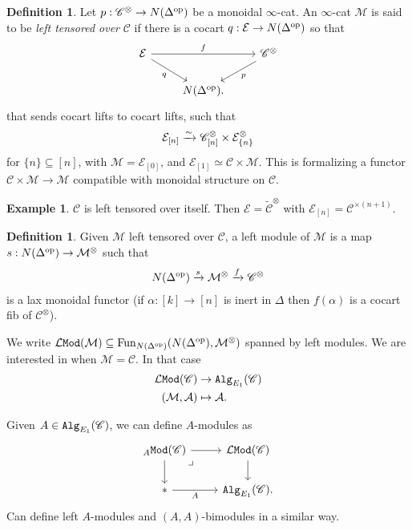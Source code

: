 \documentclass[12pt]{amsart}
\theoremstyle{definition}
\newtheorem{definition}[theorem]{Definition}
\newtheorem{example}[theorem]{Example}
\providecommand{\LMod}{\mathcal{L}\Mod}
\begin{document}
\begin{definition} Let $p: \mathscr{C}^\otimes\to N(\Delta^{\text{op}})$ be a monoidal $\infty$-cat. An $\infty$-cat $\mathcal{M}$ is said to be \textit{left tensored over} $\mathscr{C}$ if there is a cocart $q: \mathcal{E} \to N(\Delta^{\text{op}})$ so that
\[ \begin{tikzcd}
    \mathcal{E}\ar[dr,"q" below left]\ar[rr,"f"] &  & \mathscr{C}^\otimes\ar[dl,"p" below right]\\
     & N(\Delta^\op). & 
\end{tikzcd} \]
that sends cocart lifts to cocart lifts, such that
\begin{align*}
    \mathcal{E}_{[n]} \xrightarrow{\sim} \mathscr{C}_{[n]}^\otimes \times \mathcal{E}^\otimes_{\{n\}}
\end{align*}
for $\{n\} \subseteq [n]$, with $\mathcal{M} = \mathcal{E}_{[0]}$, and $\mathcal{E}_{[1]} \simeq \mathscr{C} \times \mathcal{M}$. This is formalizing a functor $\mathcal{C} \times \mathcal{M} \to \mathcal{M}$ compatible with monoidal structure on $\mathscr{C}$.
\end{definition}

\begin{example} $\mathscr{C}$ is left tensored over itself. Then $\mathcal{E} = \widetilde{\mathscr{C}}^\otimes$ with $\mathcal{E}_{[n]} = \mathscr{C}^{\times(n+1)}$.
\end{example}

\begin{definition} Given $\mathcal{M}$ left tensored over $\mathscr{C}$, a left module of $\mathcal{M}$ is a map $s: N(\Delta^{\text{op}}) \to \mathcal{M}^\otimes$ such that
\begin{align*}
    N(\Delta^{\text{op}}) \xrightarrow{s} \mathcal{M}^\otimes \xrightarrow{f} \mathscr{C}^\otimes
\end{align*}
is a lax monoidal functor (if $\alpha:[k]\to [n]$ is inert in $\Delta$ then $f(\alpha)$ is a cocart fib of $\mathscr{C}^\otimes$).
\end{definition}

We write $\LMod(\mathcal{M}) \subseteq \Fun_{N(\Delta^\op)}(N(\Delta^\op), \mathcal{M}^\otimes)$ spanned by left modules. We are interested in when $\mathcal{M} = \mathscr{C}$. In that case
\begin{align*}
    \LMod(\mathscr{C}) &\to \Alg_{E_1}(\mathscr{C}) \\
    (\mathcal{M},\mathcal{A}) &\mapsto \mathcal{A}.
\end{align*}

Given $A\in \texttt{Alg}_{E_1}(\mathscr{C})$, we can define $A$-modules as
\[ \begin{tikzcd}
    {}_A \Mod(\mathscr{C})\rar\dar\pb & \LMod(\mathscr{C})\dar\\
    \ast\rar["A" below] & \Alg_{E_1}(\mathscr{C}).
\end{tikzcd} \]
Can define left $A$-modules and $(A,A)$-bimodules in a similar way.
\end{document}
